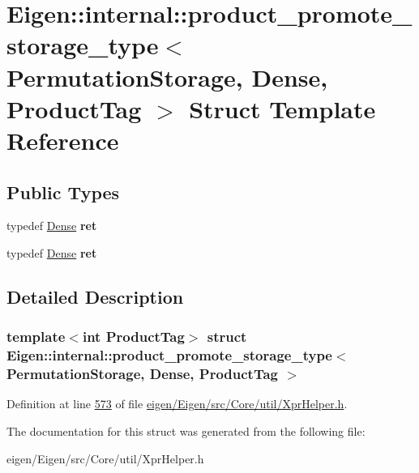 \hypertarget{struct_eigen_1_1internal_1_1product__promote__storage__type_3_01_permutation_storage_00_01_dense_00_01_product_tag_01_4}{}\section{Eigen\+:\+:internal\+:\+:product\+\_\+promote\+\_\+storage\+\_\+type$<$ Permutation\+Storage, Dense, Product\+Tag $>$ Struct Template Reference}
\label{struct_eigen_1_1internal_1_1product__promote__storage__type_3_01_permutation_storage_00_01_dense_00_01_product_tag_01_4}
\subsection*{Public Types}
\begin{DoxyCompactItemize}
\item 
\mbox{\label{struct_eigen_1_1internal_1_1product__promote__storage__type_3_01_permutation_storage_00_01_dense_00_01_product_tag_01_4_a315df19892150524bf5b33b5fa99c94f}} 
typedef \hyperlink{struct_eigen_1_1_dense}{Dense} {\bfseries ret}
\item 
\mbox{\label{struct_eigen_1_1internal_1_1product__promote__storage__type_3_01_permutation_storage_00_01_dense_00_01_product_tag_01_4_a315df19892150524bf5b33b5fa99c94f}} 
typedef \hyperlink{struct_eigen_1_1_dense}{Dense} {\bfseries ret}
\end{DoxyCompactItemize}


\subsection{Detailed Description}
\subsubsection*{template$<$int Product\+Tag$>$\newline
struct Eigen\+::internal\+::product\+\_\+promote\+\_\+storage\+\_\+type$<$ Permutation\+Storage, Dense, Product\+Tag $>$}



Definition at line \hyperlink{eigen_2_eigen_2src_2_core_2util_2_xpr_helper_8h_source_l00573}{573} of file \hyperlink{eigen_2_eigen_2src_2_core_2util_2_xpr_helper_8h_source}{eigen/\+Eigen/src/\+Core/util/\+Xpr\+Helper.\+h}.



The documentation for this struct was generated from the following file\+:\begin{DoxyCompactItemize}
\item 
eigen/\+Eigen/src/\+Core/util/\+Xpr\+Helper.\+h\end{DoxyCompactItemize}

